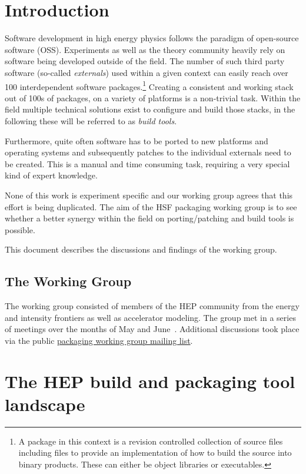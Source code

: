 \documentclass[12pt,a4paper]{article}
\begin{document}
\section{Introduction}

Software development in high energy physics follows the paradigm of open-source software (OSS). Experiments as well as the theory community heavily rely on software being developed outside of the field. The number of such third party software (so-called \emph{externals}) used within a given context can easily reach over 100 interdependent software packages.\footnote{ A package in this context is a revision controlled collection of source files including files to provide an implementation of how to build the source into binary products. These can either be object libraries or executables.}
Creating a consistent and working stack out of 100s of packages, on a variety of platforms is a non-trivial task. Within the field multiple technical solutions exist to configure and build those stacks, in the following these will be referred to as \emph{build tools}. 

Furthermore, quite often software has to be ported to new platforms and operating systems and subsequently patches to the individual externals need to be created. This is a manual and time consuming task, requiring a very special kind of expert knowledge.

None of this work is experiment specific and our working group agrees that this effort is being duplicated. The aim of the HSF packaging working group is to see whether a better synergy within the field on porting/patching and build tools is possible. 

This document describes the discussions and findings of the working group.
\subsection{The Working Group}
The working group consisted of members of the HEP community from the energy and intensity frontiers as well as accelerator modeling. The group met in a series of meetings over the months of May and June~\cite{meetings}.
Additional discussions took place via the public \href{https://groups.google.com/forum/#!forum/hep-sf-packaging-wg}{packaging working group mailing list}.

\section{The HEP build and packaging tool landscape}
\end{document}
